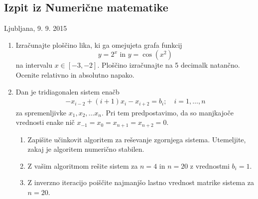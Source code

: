 \documentclass[slovene,12pt]{article}
\begin{document}
\begin{center}
\section*{Izpit iz Numerične matematike}

Ljubljana, 9. 9. 2015
\end{center}
\vskip2cm
\pagestyle{empty}

\begin{enumerate}
\item Izračunajte ploščino lika, ki ga omejujeta grafa funkcij
  \begin{equation}
    \label{eq:lik}
    y=2^x\text{ in } y=\cos(x^2)
  \end{equation}
na intervalu $x\in[-3,-2]$. Ploščino izračunajte na 5 decimalk natančno. Ocenite relativno in absolutno napako.

\item Dan je tridiagonalen sistem enačb
  \begin{eqnarray}
    \label{eq:sistem}
    -x_{i-2}+(i+1)x_i-x_{i+2}=b_i;\quad i=1,\ldots,n
  \end{eqnarray}
  za spremenljivke $x_1,x_2,\ldots x_n$. Pri tem predpostavimo, da so manjkajoče vrednosti  enake nič $x_{-1}=x_{0}=x_{n+1}=x_{n+2}=0$.
  \begin{enumerate}
  \item Zapišite učinkovit algoritem za reševanje zgornjega sistema. Utemeljite, zakaj je algoritem numerično stabilen.
  \item Z vašim algoritmom rešite sistem za $n=4$ in $n=20$ z vrednostmi $b_i=1$.
  \item Z inverzno iteracijo poiščite najmanjšo lastno vrednost matrike sistema za $n=20$.
  \end{enumerate}
\end{enumerate}
\end{document}

